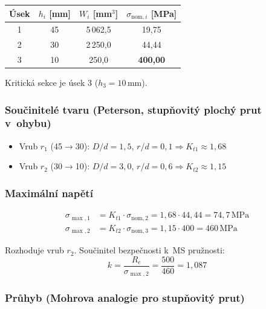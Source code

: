 \documentclass[a4paper,11pt]{article}
\newcommand{\unit}[1]{\,\mathrm{#1}}
\begin{document}
\begin{table}[H]
\centering
\begin{tabular}{cccc}
\toprule
\textbf{Úsek} & $h_i$ [mm] & $W_i$ [mm$^3$] & $\sigma_{\mathrm{nom},i}$ [MPa] \\
\midrule
1 & 45 & 5\,062{,}5 & 19{,}75 \\
2 & 30 & 2\,250{,}0 & 44{,}44 \\
3 & 10 & 250{,}0 & \textbf{400{,}00} \\
\bottomrule
\end{tabular}
\end{table}

Kritická sekce je úsek 3 ($h_3 = 10\unit{mm}$).

\subsubsection{Součinitelé tvaru (Peterson, stupňovitý plochý prut v~ohybu)}

\begin{itemize}[nosep]
    \item Vrub $r_1$ (45$\to$30): $D/d = 1{,}5$, $r/d = 0{,}1 \Rightarrow K_{t1} \approx 1{,}68$
    \item Vrub $r_2$ (30$\to$10): $D/d = 3{,}0$, $r/d = 0{,}6 \Rightarrow K_{t2} \approx 1{,}15$
\end{itemize}

\subsubsection{Maximální napětí}

\begin{align}
    \sigma_{\max,1} &= K_{t1} \cdot \sigma_{\mathrm{nom},2} = 1{,}68 \cdot 44{,}44 = 74{,}7\unit{MPa} \\
    \sigma_{\max,2} &= K_{t2} \cdot \sigma_{\mathrm{nom},3} = 1{,}15 \cdot 400 = \boxed{460\unit{MPa}}
\end{align}

Rozhoduje vrub $r_2$. Součinitel bezpečnosti k~MS pružnosti:
\begin{equation}
    k = \frac{R_e}{\sigma_{\max,2}} = \frac{500}{460} = \boxed{1{,}087}
\end{equation}

\subsubsection{Průhyb (Mohrova analogie pro stupňovitý prut)}
\end{document}
